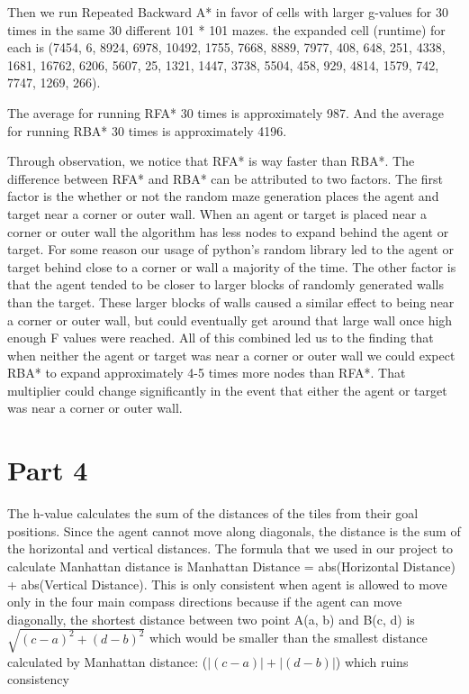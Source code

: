 \documentclass{article}
\begin{document}
Then we run Repeated Backward A* in favor of cells with larger g-values for 30 times in the same 30 different 101 * 101 mazes. the expanded cell (runtime) for each is 
(7454, 6, 8924, 6978, 10492, 1755, 7668, 8889, 7977, 408, 648, 251, 4338, 1681, 16762, 6206, 5607, 25, 1321, 1447, 3738, 5504, 458, 929, 4814, 1579, 742, 7747, 1269, 266).

The average for running RFA* 30 times is approximately 987. And the average for running RBA* 30 times is approximately 4196.

Through observation, we notice that RFA* is way faster than RBA*. The difference between RFA* and RBA* can be attributed to two factors. The first factor is the whether or not the random maze generation places the agent and target near a corner or outer wall. When an agent or target is placed near a corner or outer wall the algorithm has less nodes to expand behind the agent or target. For some reason our usage of python's random library led to the agent or target behind close to a corner or wall a majority of the time. The other factor is that the agent tended to be closer to larger blocks of randomly generated walls than the target. These larger blocks of walls caused a similar effect to being near a corner or outer wall, but could eventually get around that large wall once high enough F values were reached. All of this combined led us to the finding that when neither the agent or target was near a corner or outer wall we could expect RBA* to expand approximately 4-5 times more nodes than RFA*. That multiplier could change significantly in the event that either the agent or target was near a corner or outer wall.

\section*{Part 4}
\hspace{5mm}
The h-value calculates the sum of the distances of the tiles from their goal positions. Since the agent cannot move along diagonals, the distance is the sum of the horizontal and vertical distances. The formula that we used in our project to calculate Manhattan distance is Manhattan Distance = abs(Horizontal Distance) + abs(Vertical Distance). This is only consistent when agent is allowed to move only in the four main compass directions because if the agent can move diagonally, the shortest distance between two point A(a, b) and B(c, d) is $\sqrt{(c-a)^2+(d-b)^2}$ which would be smaller than the smallest distance calculated by Manhattan distance: ($  |(c-a)| + |(d - b)| $) which ruins consistency
\end{document}
